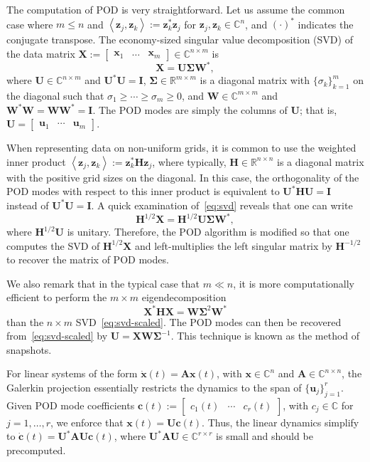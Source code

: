 \documentclass[11pt]{article}
\newcommand*{\Complex}{\mathbb{C}}
\newcommand*{\Reals}{\mathbb{R}}
\newcommand*{\half}{^{1/2}}
\newcommand*{\invhalf}{^{-1/2}}
\newcommand*{\ip}[2]{\left<#1, #2\right>}
\newcommand*{\A}{\mathbf{A}}
\renewcommand*{\H}{\mathbf{H}}
\newcommand*{\I}{\mathbf{I}}
\newcommand*{\X}{\mathbf{X}}
\newcommand*{\U}{\mathbf{U}}
\newcommand*{\W}{\mathbf{W}}
\newcommand*{\SIGMA}{\mathbf{\Sigma}}
\renewcommand*{\c}{\mathbf{c}}
\renewcommand*{\u}{\mathbf{u}}
\newcommand*{\x}{\mathbf{x}}
\newcommand*{\z}{\mathbf{z}}
\begin{document}
The computation of POD is very straightforward.
Let us assume the common case where $m \le n$ and $\ip{\z_j}{\z_k} := \z_k^* \z_j$ for $\z_j, \z_k \in \Complex^n$, and $(\cdot)^*$ indicates the conjugate transpose.
The economy-sized singular value decomposition (SVD) of the data matrix $\X := \begin{bmatrix} \x_1 & \ldots & \x_m \end{bmatrix} \in \Complex^{n \times m}$ is
\begin{equation}
    \label{eq:svd}
    \X = \U \SIGMA \W^*,
\end{equation}
where $\U \in \Complex^{n \times m}$ and $\U^* \U = \I$, $\SIGMA \in \Reals^{m \times m}$ is a diagonal matrix with $\{\sigma_k\}_{k=1}^m$ on the diagonal such that $\sigma_1 \ge \cdots \ge \sigma_m \ge 0$, and $\W \in \Complex^{m \times m}$ and $\W^* \W = \W \W^* = \I$.
The POD modes are simply the columns of $\U$; that is, $\U = \begin{bmatrix} \u_1 & \cdots & \u_m \end{bmatrix}$.

When representing data on non-uniform grids, it is common to use the weighted inner product $\ip{\z_j}{\z_k} := \z_k^* \H \z_j$, where typically, $\H \in \Reals^{n \times n}$ is a diagonal matrix with the positive grid sizes on the diagonal.
In this case, the orthogonality of the POD modes with respect to this inner product is equivalent to $\U^* \H \U = \I$ instead of $\U^* \U = \I$.
A quick examination of~\eqref{eq:svd} reveals that one can write
\begin{equation}
    \label{eq:svd-scaled}
    \H\half \X = \H\half \U \SIGMA \W^*,
\end{equation}
where $\H\half \U$ is unitary.
Therefore, the POD algorithm is modified so that one computes the SVD of $\H\half \X$ and left-multiplies the left singular matrix by $\H\invhalf$ to recover the matrix of POD modes.

We also remark that in the typical case that $m \ll n$, it is more computationally efficient to perform the $m \times m$ eigendecomposition
\begin{equation}
    \X^* \H \X = \W \SIGMA^2 \W^*
\end{equation}
than the $n \times m$ SVD~\eqref{eq:svd-scaled}.
The POD modes can then be recovered from~\eqref{eq:svd-scaled} by $\U = \X \W \SIGMA^{-1}$.
This technique is known as the method of snapshots.

For linear systems of the form $\dot{\x}(t) = \A \x(t)$, with $\x \in \Complex^n$ and $\A \in \Complex^{n \times n}$, the Galerkin projection essentially restricts the dynamics to the span of $\{\u_j\}_{j=1}^r$.
Given POD mode coefficients $\c(t) := \begin{bmatrix} c_1(t) & \cdots & c_r(t) \end{bmatrix}$, with $c_j \in \Complex$ for $j = 1, \ldots, r$, we enforce that $\x(t) = \U \c(t)$.
Thus, the linear dynamics simplify to $\dot{\c}(t) = \U^* \A \U \c(t)$, where $\U^* \A \U \in \Complex^{r \times r}$ is small and should be precomputed.
\end{document}
